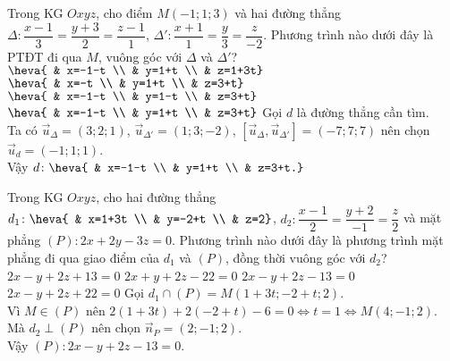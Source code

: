\begin{ex}%
	Trong KG $Oxyz$, cho điểm  $M(-1;1;3)$ và hai đường thẳng $\Delta\colon \dfrac{x-1}{3}=\dfrac{y+3}{2}=\dfrac{z-1}{1}$, $\Delta'\colon \dfrac{x+1}{1}=\dfrac{y}{3}=\dfrac{z}{-2}$. Phương trình nào dưới đây là PTĐT đi qua $M$, vuông góc với $\Delta$ và $\Delta'$?
	\choice
	{$\heva{ & x=-1-t \\ & y=1+t \\ & z=1+3t}$}
	{$\heva{ & x=-t \\ & y=1+t \\ & z=3+t}$}
	{$\heva{ & x=-1-t \\ & y=1-t \\ & z=3+t}$}
	{\True $\heva{ & x=-1-t \\ & y=1+t \\ & z=3+t}$}
	\loigiai
	{
		Gọi $d$ là đường thẳng cần tìm.\\
		Ta có $\overrightarrow{u}_{\Delta}=(3;2;1)$, $\overrightarrow{u}_{\Delta'}=(1;3;-2)$, $\left[\overrightarrow{u}_{\Delta},\overrightarrow{u}_{\Delta'}\right]=(-7;7;7)$ nên chọn $\overrightarrow{u}_{d}=(-1;1;1)$.\\
		Vậy $d\colon \heva{ & x=-1-t \\ & y=1+t \\ & z=3+t.}$
	}
\end{ex}

\begin{ex}%
	Trong KG $Oxyz$, cho hai đường thẳng $d_1\colon \heva{ & x=1+3t \\ & y=-2+t \\ & z=2}$, $d_2\colon \dfrac{x-1}{2}=\dfrac{y+2}{-1}=\dfrac{z}{2}$ và mặt phẳng $(P)\colon 2x+2y-3z=0$. Phương trình nào dưới đây là phương trình mặt phẳng đi qua giao điểm của $d_1$ và $(P)$, đồng thời vuông góc với $d_2$?
	\choice
	{$2x-y+2z+13=0$}
	{$2x+y+2z-22=0$}
	{\True $2x-y+2z-13=0$}
	{$2x-y+2z+22=0$}
	\loigiai
	{
		Gọi $d_1\cap (P)=M(1+3t;-2+t;2)$.\\
		Vì $M\in (P)$ nên $2(1+3t)+2(-2+t)-6=0\Leftrightarrow t=1 \Leftrightarrow M(4;-1;2)$.\\
		Mà $d_2\perp (P)$ nên chọn $\overrightarrow{n}_{P}=(2;-1;2)$.\\
		Vậy $(P)\colon 2x-y+2z-13=0$.
	}
\end{ex}

